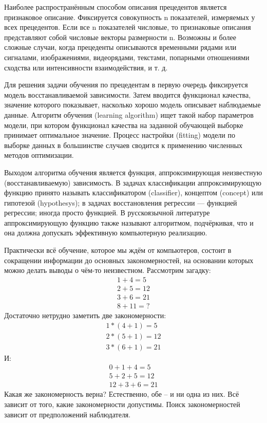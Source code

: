 \documentclass[a4paper, 12pt]{article}
\begin{document}
	Наиболее распространённым способом описания прецедентов является признаковое описание. Фиксируется совокупность n показателей, измеряемых у всех прецедентов. Если все n показателей числовые, то признаковые описания представляют собой числовые векторы размерности n. Возможны и более сложные случаи, когда прецеденты описываются временными рядами или сигналами, изображениями, видеорядами, текстами, попарными отношениями сходства или интенсивности взаимодействия, и т. д.
	
	Для решения задачи обучения по прецедентам в первую очередь фиксируется модель восстанавливаемой зависимости. Затем вводится функционал качества, значение которого показывает, насколько хорошо модель описывает наблюдаемые данные. Алгоритм обучения (learning algorithm) ищет такой набор параметров модели, при котором функционал качества на заданной обучающей выборке принимает оптимальное значение. Процесс настройки (fitting) модели по выборке данных в большинстве случаев сводится к применению численных методов оптимизации.
	
    Выходом алгоритма обучения является функция, аппроксимирующая неизвестную (восстанавливаемую) зависимость. В задачах классификации аппроксимирующую функцию принято называть классификатором (classifier), концептом (concept) или гипотезой (hypothesys); в задачах восстановления регрессии — функцией регрессии; иногда просто функцией. В русскоязычной литературе аппроксимирующую функцию также называют алгоритмом, подчёркивая, что и она должна допускать эффективную компьютерную реализацию.
	
	Практически всё обучение, которое мы ждём от компьютеров, состоит в сокращении информации до основных закономерностей, на основании которых можно делать выводы о чём-то неизвестном. Рассмотрим загадку:
	\begin{equation*}
		\begin{gathered}
		1 + 4 = 5\\
		2 + 5 = 12\\
		3 + 6 = 21\\
		8 + 11 =?
		\end{gathered}
	\end{equation*}
	Достаточно нетрудно заметить две закономерности:
	\begin{equation*}
		\begin{gathered}
		1 * (4 + 1) = 5\\
		2 * (5 + 1) = 12\\
		3 * (6 + 1) = 21
		\end{gathered}
	\end{equation*}
	И:
	\begin{equation*}
		\begin{gathered}
		0 + 1 + 4 = 5\\
		5 + 2 + 5 = 12\\
		12 + 3 + 6 = 21
		\end{gathered}
	\end{equation*}
	Какая же закономерность верна? Естественно, обе – и ни одна из них. Всё зависит от того, какие закономерности допустимы. Поиск закономерностей зависит от предположений наблюдателя.
\end{document}
